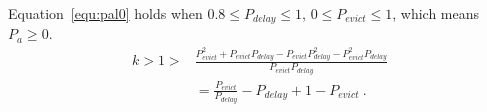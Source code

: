 Equation~\ref{equ:pal0} holds when $0.8 \leq P_{delay} \leq 1$, $0 \leq P_{evict} \leq 1$,  which means $P_{a}  \geq 0$.
  \begin{equation}
  \label{equ:pal0}
  \begin{split}
     k  > 1 > & \frac{P_{evict}^{2} + P_{evict}P_{delay} - P_{evict}P_{delay}^{2} - P_{evict}^{2}P_{delay}}{P_{evict}P_{delay}} \\
     &= \frac{P_{evict}}{P_{delay}} - P_{delay} + 1 - P_{evict} \ .
  \end{split}
  \end{equation}



